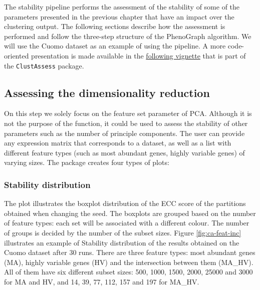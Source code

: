 The stability pipeline performs the assessment of the stability of some of the parameters presented in the previous chapter that have an impact over the clustering output. The following sections describe how the assessment is performed and follow the three-step structure of the PhenoGraph algorithm. We will use the Cuomo \cite{Cuomo2020} dataset as an example of using the pipeline. A more code-oriented presentation is made available in the \href{https://core-bioinformatics.github.io/ClustAssess/articles/stability-based-parameter-assessment.html}{following vignette} that is part of the \verb|ClustAssess| package.


\subsection{Assessing the dimensionality reduction}
On this step we solely focus on the feature set parameter of PCA. Although it is not the purpose of the function, it could be used to assess the stability of other parameters such as the number of principle components. The user can provide any expression matrix that corresponds to a dataset, as well as a list with different feature types (such as most abundant genes, highly variable genes) of varying sizes. The package creates four types of plots:

\subsubsection{Stability distribution}
The plot illustrates the boxplot distribution of the ECC score of the partitions obtained when changing the seed. The boxplots are grouped based on the number of feature types: each set will be associated with a different colour. The number of groups is decided by the number of the subset sizes. Figure \ref{fig:ca-feat-inc} illustrates an example of Stability distribution of the results obtained on the Cuomo dataset after 30 runs. There are three feature types: most abundant genes (MA), highly variable genes (HV) and the intersection between them (MA\_HV). All of them have six different subset sizes: 500, 1000, 1500, 2000, 25000 and 3000 for MA and HV, and 14, 39, 77, 112, 157 and 197 for MA\_HV. 

